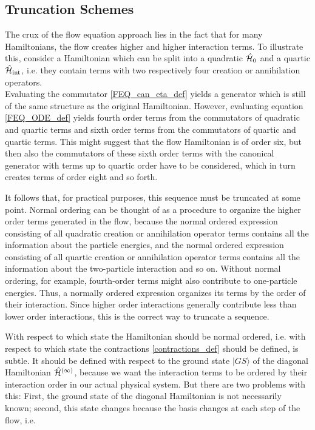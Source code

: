\subsection{Truncation Schemes}\label{Truncation Schemes}
The crux of the flow equation approach lies in the fact that for many Hamiltonians, the flow creates higher and higher interaction terms. To illustrate this, consider a Hamiltonian which can be split into a quadratic $\hat{\mathcal{H}}_0$ and a quartic $\hat{\mathcal{H}}_{\mathrm{int}}$, i.e. they contain terms with two respectively four creation or annihilation operators. \\
Evaluating the commutator \ref{FEQ_can_eta_def} yields a generator which is still of the same structure as the original Hamiltonian. However, evaluating equation \ref{FEQ_ODE_def}  yields fourth order terms from the commutators of quadratic and quartic terms and sixth order terms from the commutators of quartic and quartic terms. This might suggest that the flow Hamiltonian is of order six, but then also the commutators of these sixth order terms with the canonical generator with terms up to quartic order have to be considered, which in turn creates terms of order eight and so forth. \par
It follows that, for practical purposes, this sequence must be truncated at some point. Normal ordering can be thought of as a procedure to organize the higher order terms generated in the flow, because the normal ordered expression consisting of all quadratic creation or annihilation operator terms contains all the information about the particle energies, and the normal ordered expression consisting of all quartic creation or annihilation operator terms contains all the information about the two-particle interaction and so on. Without normal ordering, for example, fourth-order terms might also contribute to one-particle energies. Thus, a normally ordered expression organizes its terms by the order of their interaction. Since higher order interactions generally contribute less than lower order interactions, this is the correct way to truncate a sequence. \par
With respect to which state the Hamiltonian should be normal ordered, i.e. with respect to which state the contractions \ref{contractions_def} should be defined, is subtle. It should be defined with respect to the ground state $|GS\rangle$ of the diagonal Hamiltonian $\hat{\mathcal{H}}^{(\infty)}$, because we want the interaction terms to be ordered by their interaction order in our actual physical system. But there are two problems with this: First, the ground state of the diagonal Hamiltonian is not necessarily known; second, this state changes because the basis changes at each step of the flow, i.e. 
